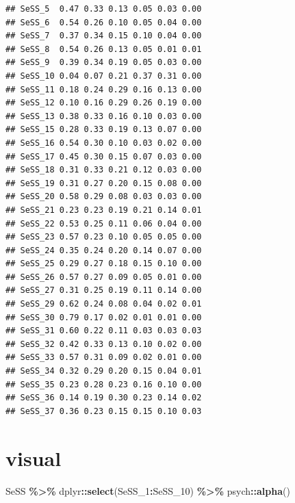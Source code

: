 \documentclass[
]{article}
\newenvironment{Shaded}{\begin{snugshade}}{\end{snugshade}}
\newcommand{\FunctionTok}[1]{\textcolor[rgb]{0.13,0.29,0.53}{\textbf{#1}}}
\newcommand{\NormalTok}[1]{#1}
\newcommand{\SpecialCharTok}[1]{\textcolor[rgb]{0.81,0.36,0.00}{\textbf{#1}}}
\begin{document}
\begin{verbatim}
## SeSS_5  0.47 0.33 0.13 0.05 0.03 0.00
## SeSS_6  0.54 0.26 0.10 0.05 0.04 0.00
## SeSS_7  0.37 0.34 0.15 0.10 0.04 0.00
## SeSS_8  0.54 0.26 0.13 0.05 0.01 0.01
## SeSS_9  0.39 0.34 0.19 0.05 0.03 0.00
## SeSS_10 0.04 0.07 0.21 0.37 0.31 0.00
## SeSS_11 0.18 0.24 0.29 0.16 0.13 0.00
## SeSS_12 0.10 0.16 0.29 0.26 0.19 0.00
## SeSS_13 0.38 0.33 0.16 0.10 0.03 0.00
## SeSS_15 0.28 0.33 0.19 0.13 0.07 0.00
## SeSS_16 0.54 0.30 0.10 0.03 0.02 0.00
## SeSS_17 0.45 0.30 0.15 0.07 0.03 0.00
## SeSS_18 0.31 0.33 0.21 0.12 0.03 0.00
## SeSS_19 0.31 0.27 0.20 0.15 0.08 0.00
## SeSS_20 0.58 0.29 0.08 0.03 0.03 0.00
## SeSS_21 0.23 0.23 0.19 0.21 0.14 0.01
## SeSS_22 0.53 0.25 0.11 0.06 0.04 0.00
## SeSS_23 0.57 0.23 0.10 0.05 0.05 0.00
## SeSS_24 0.35 0.24 0.20 0.14 0.07 0.00
## SeSS_25 0.29 0.27 0.18 0.15 0.10 0.00
## SeSS_26 0.57 0.27 0.09 0.05 0.01 0.00
## SeSS_27 0.31 0.25 0.19 0.11 0.14 0.00
## SeSS_29 0.62 0.24 0.08 0.04 0.02 0.01
## SeSS_30 0.79 0.17 0.02 0.01 0.01 0.00
## SeSS_31 0.60 0.22 0.11 0.03 0.03 0.03
## SeSS_32 0.42 0.33 0.13 0.10 0.02 0.00
## SeSS_33 0.57 0.31 0.09 0.02 0.01 0.00
## SeSS_34 0.32 0.29 0.20 0.15 0.04 0.01
## SeSS_35 0.23 0.28 0.23 0.16 0.10 0.00
## SeSS_36 0.14 0.19 0.30 0.23 0.14 0.02
## SeSS_37 0.36 0.23 0.15 0.15 0.10 0.03
\end{verbatim}

\section{visual}\label{visual}

\begin{Shaded}
\begin{Highlighting}[]
\NormalTok{SeSS }\SpecialCharTok{\%\textgreater{}\%}\NormalTok{ dplyr}\SpecialCharTok{::}\FunctionTok{select}\NormalTok{(SeSS\_1}\SpecialCharTok{:}\NormalTok{SeSS\_10) }\SpecialCharTok{\%\textgreater{}\%}\NormalTok{ psych}\SpecialCharTok{::}\FunctionTok{alpha}\NormalTok{()}
\end{Highlighting}
\end{Shaded}
\end{document}
